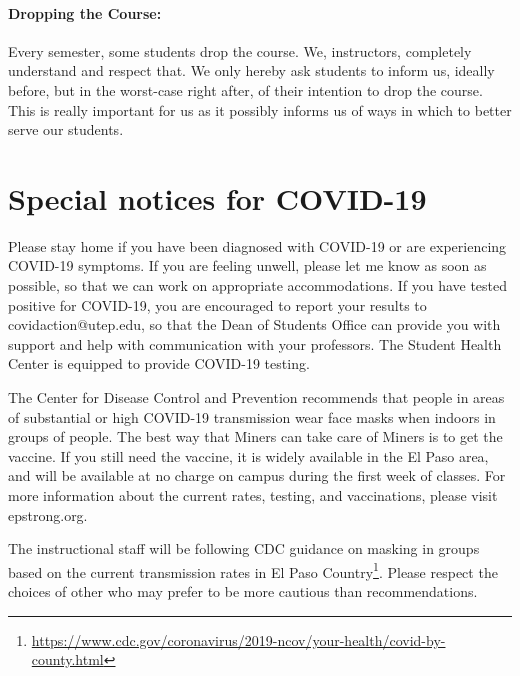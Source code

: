 \documentclass[12pt]{scrartcl}
\begin{document}
\paragraph{Dropping the Course:} 
Every semester, some students drop the course. We, instructors, completely understand and respect that. We only hereby ask students to inform us, ideally before, but in the worst-case right after, of their intention to drop the course. This is really important for us as it possibly informs us of ways in which to better serve our students.


\section{Special notices for COVID-19}

Please stay home if you have been diagnosed with COVID-19 or are experiencing COVID-19 symptoms. 
If you are feeling unwell, please let me know as soon as possible, so that we can work on appropriate accommodations. 
If you have tested positive for COVID-19, 
you are encouraged to report your results to covidaction@utep.edu, 
so that the Dean of Students Office can provide you with support and help with communication with your professors. 
The Student Health Center is equipped to provide COVID-19 testing. 
 
The Center for Disease Control and Prevention recommends that people 
in areas of substantial or high COVID-19 transmission wear face masks when indoors in groups of people. 
The best way that Miners can take care of Miners is to get the vaccine. 
If you still need the vaccine, it is widely available in the El Paso area, 
and will be available at no charge on campus during the first week of classes. 
For more information about the current rates, testing, and vaccinations, please visit epstrong.org.

\begin{tcolorbox}[colback=red!5,colframe=red!75!black,title=Masks in the classroom]
The instructional staff will be following CDC guidance on masking in groups based on the current transmission rates in El Paso Country\footnote{\url{https://www.cdc.gov/coronavirus/2019-ncov/your-health/covid-by-county.html}}. 
Please respect the choices of other who may prefer to be more cautious than recommendations. 
\end{tcolorbox}
\end{document}
